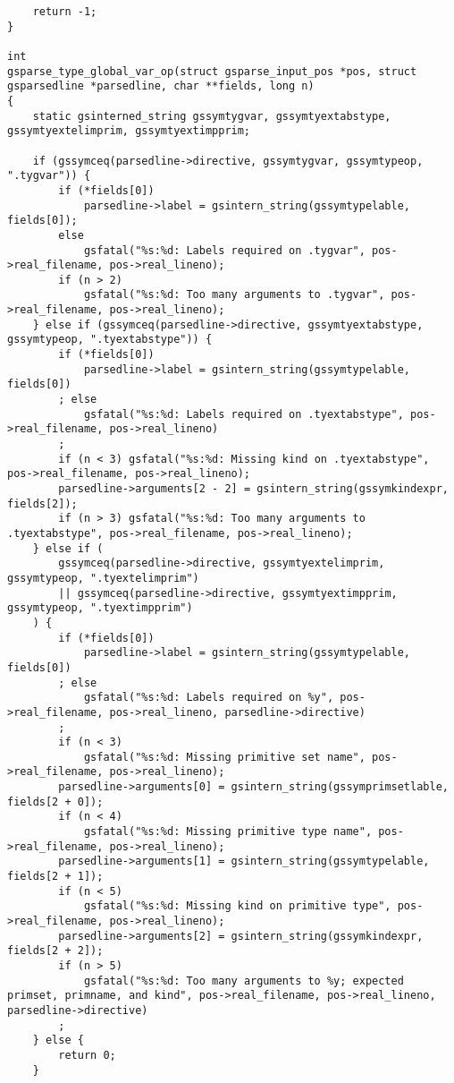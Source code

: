 \documentclass{report}
\begin{document}
\begin{verbatim}
    return -1;
}

int
gsparse_type_global_var_op(struct gsparse_input_pos *pos, struct gsparsedline *parsedline, char **fields, long n)
{
    static gsinterned_string gssymtygvar, gssymtyextabstype, gssymtyextelimprim, gssymtyextimpprim;

    if (gssymceq(parsedline->directive, gssymtygvar, gssymtypeop, ".tygvar")) {
        if (*fields[0])
            parsedline->label = gsintern_string(gssymtypelable, fields[0]);
        else
            gsfatal("%s:%d: Labels required on .tygvar", pos->real_filename, pos->real_lineno);
        if (n > 2)
            gsfatal("%s:%d: Too many arguments to .tygvar", pos->real_filename, pos->real_lineno);
    } else if (gssymceq(parsedline->directive, gssymtyextabstype, gssymtypeop, ".tyextabstype")) {
        if (*fields[0])
            parsedline->label = gsintern_string(gssymtypelable, fields[0])
        ; else
            gsfatal("%s:%d: Labels required on .tyextabstype", pos->real_filename, pos->real_lineno)
        ;
        if (n < 3) gsfatal("%s:%d: Missing kind on .tyextabstype", pos->real_filename, pos->real_lineno);
        parsedline->arguments[2 - 2] = gsintern_string(gssymkindexpr, fields[2]);
        if (n > 3) gsfatal("%s:%d: Too many arguments to .tyextabstype", pos->real_filename, pos->real_lineno);
    } else if (
        gssymceq(parsedline->directive, gssymtyextelimprim, gssymtypeop, ".tyextelimprim")
        || gssymceq(parsedline->directive, gssymtyextimpprim, gssymtypeop, ".tyextimpprim")
    ) {
        if (*fields[0])
            parsedline->label = gsintern_string(gssymtypelable, fields[0])
        ; else
            gsfatal("%s:%d: Labels required on %y", pos->real_filename, pos->real_lineno, parsedline->directive)
        ;
        if (n < 3)
            gsfatal("%s:%d: Missing primitive set name", pos->real_filename, pos->real_lineno);
        parsedline->arguments[0] = gsintern_string(gssymprimsetlable, fields[2 + 0]);
        if (n < 4)
            gsfatal("%s:%d: Missing primitive type name", pos->real_filename, pos->real_lineno);
        parsedline->arguments[1] = gsintern_string(gssymtypelable, fields[2 + 1]);
        if (n < 5)
            gsfatal("%s:%d: Missing kind on primitive type", pos->real_filename, pos->real_lineno);
        parsedline->arguments[2] = gsintern_string(gssymkindexpr, fields[2 + 2]);
        if (n > 5)
            gsfatal("%s:%d: Too many arguments to %y; expected primset, primname, and kind", pos->real_filename, pos->real_lineno, parsedline->directive)
        ;
    } else {
        return 0;
    }


\end{verbatim}
\end{document}
